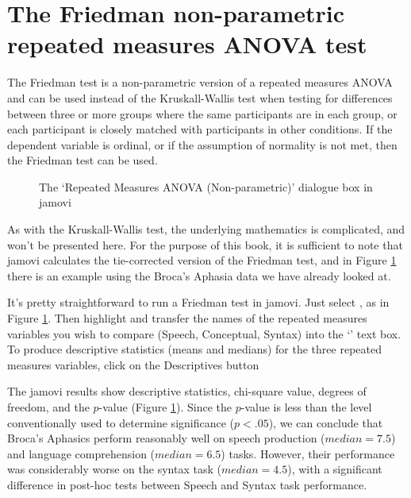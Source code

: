 \section{The Friedman non-parametric repeated measures ANOVA test~\label{sec:Friedman}}

The Friedman test is a non-parametric version of a repeated measures ANOVA and can be used instead of the Kruskall-Wallis test when testing for differences between three or more groups where the same participants are in each group, or each participant is closely matched with participants in other conditions. If the dependent variable is ordinal, or if the assumption of normality is not met, then the Friedman test can be used. 

\vspace{0.5cm}
\begin{figure}[!ht]
\begin{center}
\caption{The `Repeated Measures ANOVA (Non-parametric)' dialogue box in jamovi}
\HR
\label{fig:RManova6}
\end{center}
\end{figure}

As with the Kruskall-Wallis test, the underlying mathematics is complicated, and won't be presented here. For the purpose of this book, it is sufficient to note that jamovi calculates the tie-corrected version of the Friedman test, and in Figure \ref{fig:RManova6} there is an example using the Broca's Aphasia data we have already looked at. 

It's pretty straightforward to run a Friedman test in jamovi. Just select , as in Figure \ref{fig:RManova6}. Then highlight and transfer the names of the repeated measures variables you wish to compare (Speech, Conceptual, Syntax) into the `'  text box. To produce descriptive statistics (means and medians) for the three repeated measures variables, click on the Descriptives button 

The jamovi results show descriptive statistics, chi-square value, degrees of freedom, and the $p$-value (Figure \ref{fig:RManova6}). Since the $p$-value is less than the level conventionally used to determine significance ($p<.05$), we can conclude that Broca’s Aphasics perform reasonably well on speech production ($median=7.5$) and language comprehension ($median=6.5$) tasks. However, their performance was considerably worse on the syntax task ($median=4.5$), with a significant difference in post-hoc tests between Speech and Syntax task performance. 


